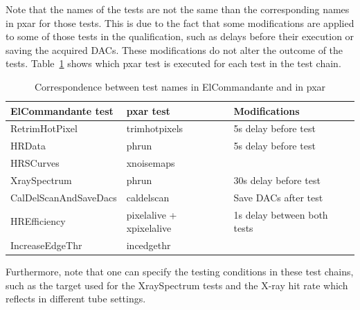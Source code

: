 \documentclass[a4paper,12pt,twoside]{article}
\begin{document}
\begin{itemize}
Note that the names of the tests are not the same than the corresponding names in pxar for those tests. This is due to the fact that some modifications are applied to some of those tests in the qualification, such as delays before their execution or saving the acquired DACs. These modifications do not alter the outcome of the tests. 
Table~\ref{tests} shows which pxar test is executed for each test in the test chain.


\begin{table}[]
\centering
\caption{Correspondence between test names in ElCommandante and in pxar}
\label{tests}
\begin{tabular}{@{}lll@{}}
\toprule
ElCommandante test    & pxar test                & Modifications               \\ \midrule
RetrimHotPixel        & trimhotpixels            & 5s delay before test        \\
HRData                & phrun                    & 5s delay before test        \\
HRSCurves             & xnoisemaps\footnotemark             &                             \\
XraySpectrum          & phrun                    & 30s delay before test       \\
CalDelScanAndSaveDacs & caldelscan\footnotemark[\value{footnote}]               & Save DACs after test        \\
HREfficiency          & pixelalive + xpixelalive\footnotemark[\value{footnote}] & 1s delay between both tests \\
IncreaseEdgeThr       & incedgethr               &                             \\ \bottomrule
\end{tabular}
\end{table}



Furthermore, note that one can specify the testing conditions in these test chains, such as the target used for the XraySpectrum tests and the X-ray hit rate which reflects in different tube settings.



\end{itemize}
\end{document}
